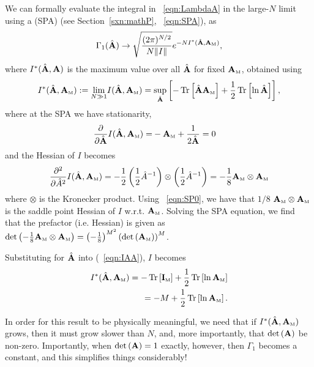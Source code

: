 We can formally evaluate the integral in \EQN~\ref{eqn:LambdaA} in the large-$N$ limit using a \SaddlePointApproximation (SPA)
(see Section~\ref{sxn:mathP}, \EQN~\ref{eqn:SPA}), as
\begin{align}
\label{eqn:LAMBDA}
\Gamma_1(\hat{\mathbf{A}})\rightarrow \sqrt{\dfrac{(2\pi)^{N/2}}{N\Vert I\Vert}}e^{-N I^{*}(\hat{\mathbf{A}}, {\mathbf{A}}_{\text{\tiny M}})}  ,
\end{align}
where $I^{*}(\hat{\mathbf{A}},\mathbf{A})$ is the maximum value over all $\hat{\mathbf{A}}$ for fixed ${\mathbf{A}}_{\text{\tiny M}}$, obtained using
\begin{align}
  \label{eqn:IAA-sup}
  I^{*}(\hat{\mathbf{A}},{\mathbf{A}}_{\text{\tiny M}}) :=
\underset{N\gg 1}{\lim} I(\hat{\mathbf{A}},{\mathbf{A}}_{\text{\tiny M}}) =
 \underset{\hat{\mathbf{A}}}{\sup}\left[-\mbox{}\operatorname{Tr}\left[\hat{\mathbf{A}}{\mathbf{A}}_{\text{\tiny M}}\right]+\frac{1}{2}\mbox{}\operatorname{Tr}\left[\ln\hat{\mathbf{A}}\right]\right]  ,
\end{align}
where at the SPA we have stationarity,
\begin{align}
  \label{eqn:SP0}
  \dfrac{\partial}{\partial\hat{\mathbf{A}}}I(\hat{\mathbf{A}},{\mathbf{A}}_{\text{\tiny M}}) =& -{\mathbf{A}}_{\text{\tiny M}}+\dfrac{1}{2\hat{\mathbf{A}}}=0  
\end{align}
and the Hessian of $I$ becomes
\begin{align}
  \label{eqn:Ixx}
\frac{\partial^2 }{\partial \hat{A}^2} I(\hat{\mathbf{A}},{\mathbf{A}}_{\text{\tiny M}})= -\frac{1}{2} \left( \frac{1}{2} \hat{A}^{-1} \right) \otimes \left( \frac{1}{2} \hat{A}^{-1} \right) = -\frac{1}{8} {\mathbf{A}}_{\text{\tiny M}} \otimes {\mathbf{A}}_{\text{\tiny M}}
\end{align}
where $\otimes$ is the Kronecker product. Using \EQN~\ref{eqn:SP0}, we have that $1 / 8$ ${\mathbf{A}}_{\text{\tiny M}} \otimes {\mathbf{A}}_{\text{\tiny M}}$ is the saddle point Hessian of $I$ w.r.t. ${\mathbf{A}}_{\text{\tiny M}}$. Solving the SPA equation, we find that %
the prefactor (i.e. Hessian) is given as
$ \mbox{}{\text{det}}\left(-\frac{1}{8} {\mathbf{A}}_{\text{\tiny M}} \otimes {\mathbf{A}}_{\text{\tiny M}}\right) = \left( -\frac{1}{8} \right)^{M^2} \left(  \mbox{}{\text{det}}\left({\mathbf{A}}_{\text{\tiny M}}\right) \right)^M$.   

Substituting for $\hat{\mathbf{A}}$ into \RateFunction (\EQN~\ref{eqn:IAA}), $I$ becomes
\begin{align}
\label{eqn:IAA_2}
I^{*}(\hat{\mathbf{A}},{\mathbf{A}}_{\text{\tiny M}}) = -\mbox{}\operatorname{Tr}\left[ \mathbf{I}_{\text{\tiny M}} \right] + \frac{1}{2}\mbox{}\operatorname{Tr}\left[ \ln{\mathbf{A}}_{\text{\tiny M}} \right]   \\ \nonumber
 = -M + \frac{1}{2}\mbox{}\operatorname{Tr}\left[ \ln{\mathbf{A}}_{\text{\tiny M}} \right]  .
\end{align}

\noindent
In order for this result to be physically meaningful, 
we need that if $I^{*}(\hat{\mathbf{A}},{\mathbf{A}}_{\text{\tiny M}})$ grows,
then it must grow slower than $N$, and,
more importantly, that $\mbox{}{\text{det}}\left(\mathbf{A}\right)$ be non-zero.
Importantly, when $\mbox{}{\text{det}}\left(\mathbf{A}\right)=1$ exactly, however, then $\Gamma_1$ becomes a constant,
and this simplifies things considerably!

